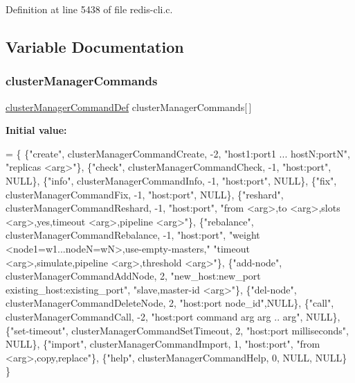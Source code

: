 Definition at line 5438 of file redis-\/cli.\+c.



\subsection{Variable Documentation}
\mbox{\label{redis-cli_8c_af5c710599aca211f76878c21dbf2c6e2}} 
\subsubsection{\texorpdfstring{cluster\+Manager\+Commands}{clusterManagerCommands}}
{\footnotesize\ttfamily \hyperlink{structcluster_manager_command_def}{cluster\+Manager\+Command\+Def} cluster\+Manager\+Commands\mbox{[}$\,$\mbox{]}}

{\bfseries Initial value\+:}
\begin{DoxyCode}
= \{
    \{\textcolor{stringliteral}{"create"}, clusterManagerCommandCreate, -2, \textcolor{stringliteral}{"host1:port1 ... hostN:portN"},
     \textcolor{stringliteral}{"replicas <arg>"}\},
    \{\textcolor{stringliteral}{"check"}, clusterManagerCommandCheck, -1, \textcolor{stringliteral}{"host:port"}, NULL\},
    \{\textcolor{stringliteral}{"info"}, clusterManagerCommandInfo, -1, \textcolor{stringliteral}{"host:port"}, NULL\},
    \{\textcolor{stringliteral}{"fix"}, clusterManagerCommandFix, -1, \textcolor{stringliteral}{"host:port"}, NULL\},
    \{\textcolor{stringliteral}{"reshard"}, clusterManagerCommandReshard, -1, \textcolor{stringliteral}{"host:port"},
     \textcolor{stringliteral}{"from <arg>,to <arg>,slots <arg>,yes,timeout <arg>,pipeline <arg>"}\},
    \{\textcolor{stringliteral}{"rebalance"}, clusterManagerCommandRebalance, -1, \textcolor{stringliteral}{"host:port"},
     \textcolor{stringliteral}{"weight <node1=w1...nodeN=wN>,use-empty-masters,"}
     \textcolor{stringliteral}{"timeout <arg>,simulate,pipeline <arg>,threshold <arg>"}\},
    \{\textcolor{stringliteral}{"add-node"}, clusterManagerCommandAddNode, 2,
     \textcolor{stringliteral}{"new\_host:new\_port existing\_host:existing\_port"}, \textcolor{stringliteral}{"slave,master-id <arg>"}\},
    \{\textcolor{stringliteral}{"del-node"}, clusterManagerCommandDeleteNode, 2, \textcolor{stringliteral}{"host:port node\_id"},NULL\},
    \{\textcolor{stringliteral}{"call"}, clusterManagerCommandCall, -2,
        \textcolor{stringliteral}{"host:port command arg arg .. arg"}, NULL\},
    \{\textcolor{stringliteral}{"set-timeout"}, clusterManagerCommandSetTimeout, 2,
     \textcolor{stringliteral}{"host:port milliseconds"}, NULL\},
    \{\textcolor{stringliteral}{"import"}, clusterManagerCommandImport, 1, \textcolor{stringliteral}{"host:port"},
     \textcolor{stringliteral}{"from <arg>,copy,replace"}\},
    \{\textcolor{stringliteral}{"help"}, clusterManagerCommandHelp, 0, NULL, NULL\}
\}
\end{DoxyCode}


